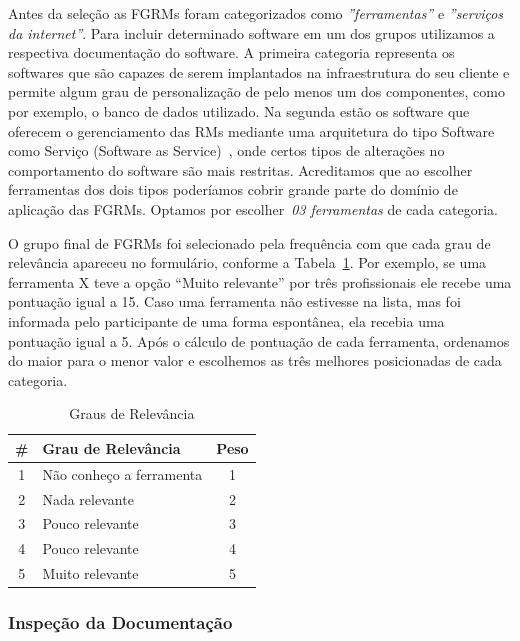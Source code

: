 Antes da seleção as FGRMs foram categorizados como \textit{''ferramentas''} e
\textit{''serviços da internet''}. Para incluir determinado software em um dos
grupos utilizamos a respectiva documentação do software. A primeira categoria
representa os softwares que são capazes de serem implantados na infraestrutura
do seu cliente e permite algum grau de personalização de pelo menos um dos
componentes, como por exemplo, o banco de dados utilizado. Na segunda estão os
software que oferecem o gerenciamento das RMs mediante uma arquitetura do tipo
Software como Serviço (Software as Service)~\cite{fox2013engineering}, onde
certos tipos de alterações no comportamento do software são mais restritas.
Acreditamos que ao escolher ferramentas dos dois tipos poderíamos cobrir grande
parte do domínio de aplicação das FGRMs. Optamos por escolher~\textit{03
    ferramentas} de cada categoria.


O grupo final de FGRMs foi selecionado pela frequência com que cada grau de
relevância apareceu no formulário, conforme a Tabela~\ref{tab:graus_relevancia}.
Por exemplo, se uma ferramenta X teve a opção ``Muito relevante'' por três
profissionais ele recebe uma pontuação igual a 15. Caso uma ferramenta não
estivesse na lista, mas foi informada pelo participante de uma forma espontânea,
ela recebia uma pontuação igual a 5. Após o cálculo de pontuação de cada
ferramenta, ordenamos do maior para o menor valor e escolhemos as três melhores
posicionadas de cada categoria.

\begin{table}[htpb]
\centering
\begin{tabular}{@{}clc@{}}
\toprule
\textbf{\#} & \textbf{Grau de Relevância} & \textbf{Peso} \\ \midrule
1 & Não conheço a ferramenta & 1 \\
2 & Nada relevante & 2 \\
3 & Pouco relevante & 3 \\
4 & Pouco relevante & 4 \\
5 & Muito relevante & 5 \\ \bottomrule
\end{tabular}
\caption{Graus de Relevância}
\label{tab:graus_relevancia}
\end{table}

\subsubsection{Inspeção da Documentação}
\label{subsec:inspecao_doumentacao}

